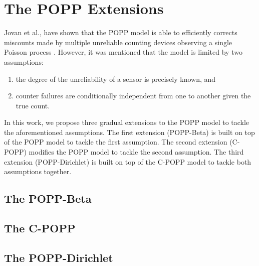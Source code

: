 \section{The POPP Extensions}
\label{sec:popp_extensions}

Jovan et al., have shown that the POPP model is able to efficiently corrects miscounts made by multiple unreliable counting devices observing a single Poisson process \cite{jovan18a} . However, it was mentioned that the model is limited by two assumptions:
\begin{enumerate}
    \item the degree of the unreliability of a sensor is precisely known, and
    \item counter failures are conditionally independent from one to another given the true count. 
\end{enumerate}
In this work, we propose three gradual extensions to the POPP model to tackle the aforementioned assumptions. The first extension (POPP-Beta) is built on top of the POPP model to tackle the first assumption. The second extension (C-POPP) modifies the POPP model to tackle the second assumption. The third extension (POPP-Dirichlet) is built on top of the C-POPP model to tackle both assumptions together. 

\subsection{The POPP-Beta}

\subsection{The C-POPP}

\subsection{The POPP-Dirichlet}
